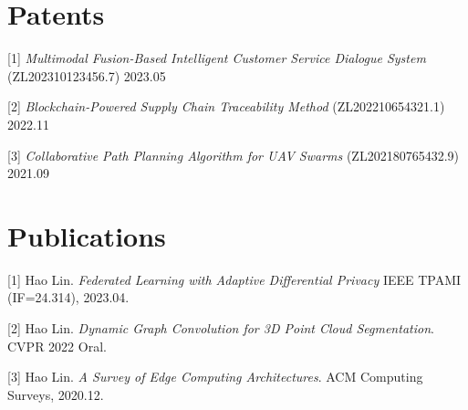 \documentclass{cls/simplecv}
\begin{document}
\section{Patents}

[1] \emph{Multimodal Fusion-Based Intelligent Customer Service Dialogue System} (ZL202310123456.7) 2023.05

[2] \emph{Blockchain-Powered Supply Chain Traceability Method} (ZL202210654321.1) 2022.11

[3] \emph{Collaborative Path Planning Algorithm for UAV Swarms} (ZL202180765432.9) 2021.09


\section{Publications}
[1] Hao Lin. \emph{Federated Learning with Adaptive Differential Privacy}
IEEE TPAMI (IF=24.314), 2023.04.

[2] Hao Lin. \emph{Dynamic Graph Convolution for 3D Point Cloud Segmentation}. CVPR 2022 Oral.

[3] Hao Lin. \emph{A Survey of Edge Computing Architectures}. ACM Computing Surveys, 2020.12.
\end{document}
